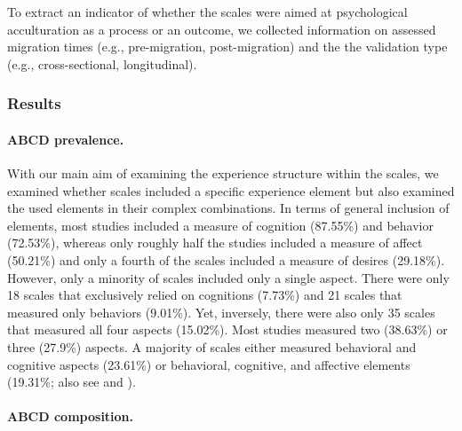 To extract an indicator of whether the scales were aimed at
psychological acculturation as a process or an outcome, we collected
information on assessed migration times (e.g., pre-migration,
post-migration) and the the validation type (e.g., cross-sectional,
longitudinal).

\subsubsection{Results}

\paragraph{ABCD prevalence.}

With our main aim of examining the experience structure within the
scales, we examined whether scales included a specific experience
element but also examined the used elements in their complex
combinations. In terms of general inclusion of elements, most studies
included a measure of cognition (87.55\%) and behavior (72.53\%),
whereas only roughly half the studies included a measure of affect
(50.21\%) and only a fourth of the scales included a measure of desires
(29.18\%). However, only a minority of scales included only a single
aspect. There were only 18 scales that exclusively relied on cognitions
(7.73\%) and 21 scales that measured only behaviors (9.01\%). Yet,
inversely, there were also only 35 scales that measured all four aspects
(15.02\%). Most studies measured two (38.63\%) or three (27.9\%)
aspects. A majority of scales either measured behavioral and cognitive
aspects (23.61\%) or behavioral, cognitive, and affective elements
(19.31\%; also see  and
).

\paragraph{ABCD composition.}

